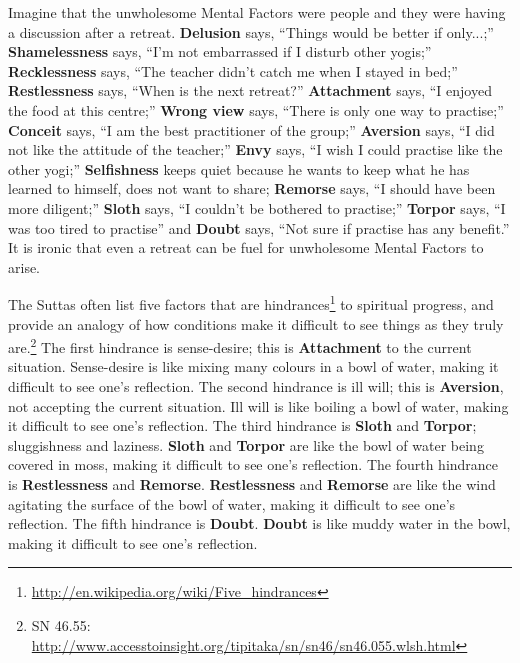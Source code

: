 Imagine that the unwholesome Mental Factors were people and they were having a discussion after a retreat. \textbf{Delusion} says, “Things would be better if only...;” \textbf{Shamelessness} says, “I’m not embarrassed if I disturb other yogis;” \textbf{Recklessness} says, “The teacher didn’t catch me when I stayed in bed;” \textbf{Restlessness} says, “When is the next retreat?” \textbf{Attachment} says, “I enjoyed the food at this centre;” \textbf{Wrong view} says, “There is only one way to \color{blue} practise\color{black};” \textbf{Conceit} says, “I am the best practitioner of the group;” \textbf{Aversion} says, “I did not like the attitude of the teacher;” \textbf{Envy} says, “I wish I could \color{blue} practise\color{black} like the other yogi;” \textbf{Selfishness} keeps quiet because he wants to keep what he has learned to himself, does not want to share; \textbf{Remorse} says, “I should have been more diligent;” \textbf{Sloth} says, “I couldn’t be bothered to \color{blue} practise\color{black};” \textbf{Torpor} says, “I was too tired to \color{blue} practise\color{black}” and \textbf{Doubt} says, “Not sure if \color{blue} practise\color{black} has any benefit.” It is ironic that even a retreat can be fuel for unwholesome Mental Factors to arise.

The Suttas often list five factors that are hindrances\footnote{\url{http://en.wikipedia.org/wiki/Five_hindrances}} to spiritual progress, and provide an analogy of how conditions make it difficult to see things as they truly are.\footnote{SN 46.55: \url{http://www.accesstoinsight.org/tipitaka/sn/sn46/sn46.055.wlsh.html}} The first hindrance is sense-desire; this is \textbf{Attachment} to the current situation. Sense-desire is like mixing many colours in a bowl of water, making it difficult to see one’s reflection. The second hindrance is ill will; this is \textbf{Aversion}, not accepting the current situation. Ill will is like boiling a bowl of water, making it difficult to see one’s reflection. The third hindrance is \textbf{Sloth} and \textbf{Torpor}; sluggishness and laziness. \textbf{Sloth} and \textbf{Torpor} are like the bowl of water being covered in moss, making it difficult to see one’s reflection. The fourth hindrance is \textbf{Restlessness} and \textbf{Remorse}. \textbf{Restlessness} and \textbf{Remorse} are like the wind agitating the surface of the bowl of water, making it difficult to see one’s reflection. The fifth hindrance is \textbf{Doubt}. \textbf{Doubt} is like muddy water in the bowl, making it difficult to see one’s reflection.

